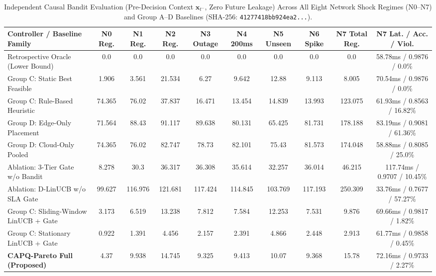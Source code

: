 \documentclass[10pt,journal,compsoc]{IEEEtran}
\begin{document}
\begin{table}[!htbp]\centering\scriptsize
\caption{Independent Causal Bandit Evaluation (Pre-Decision Context $\mathbf{x}_{t^-}$, Zero Future Leakage) Across All Eight Network Shock Regimes (N0--N7) and Group A--D Baselines (SHA-256: \texttt{41277418bb924ea2...}).}
\setlength{\tabcolsep}{3.5pt}\begin{tabular}{@{}lccccccccc@{}}\toprule
\textbf{Controller / Baseline Family} & \textbf{N0 Reg.} & \textbf{N1 Reg.} & \textbf{N2 Reg.} & \textbf{N3 Outage} & \textbf{N4 200ms} & \textbf{N5 Unseen} & \textbf{N6 Spike} & \textbf{N7 Total Reg.} & \textbf{N7 Lat. / Acc. / Viol.} \\\midrule
Retrospective Oracle (Lower Bound) & 0.0 & 0.0 & 0.0 & 0.0 & 0.0 & 0.0 & 0.0 & 0.0 & 58.78ms / 0.9876 / 0.0\% \\
Group C: Static Best Feasible & 1.906 & 3.561 & 21.534 & 6.27 & 9.642 & 12.88 & 9.113 & 8.005 & 70.54ms / 0.9876 / 0.0\% \\
Group C: Rule-Based Heuristic & 74.365 & 76.02 & 37.837 & 16.471 & 13.454 & 14.839 & 13.993 & 123.075 & 61.93ms / 0.8563 / 16.82\% \\
Group D: Edge-Only Placement & 71.564 & 88.43 & 91.117 & 89.638 & 80.131 & 65.425 & 81.731 & 178.188 & 83.19ms / 0.9081 / 61.36\% \\
Group D: Cloud-Only Pooled & 74.365 & 76.02 & 82.747 & 78.73 & 82.101 & 75.43 & 81.573 & 174.048 & 58.88ms / 0.8085 / 25.0\% \\
Ablation: 3-Tier Gate w/o Bandit & 8.278 & 30.3 & 36.317 & 36.308 & 35.614 & 32.257 & 36.014 & 46.215 & 117.74ms / 0.9707 / 10.45\% \\
Ablation: D-LinUCB w/o SLA Gate & 99.627 & 116.976 & 121.681 & 117.424 & 114.845 & 103.769 & 117.193 & 250.309 & 33.76ms / 0.7677 / 57.27\% \\
Group C: Sliding-Window LinUCB + Gate & 3.173 & 6.519 & 13.238 & 7.812 & 7.584 & 12.253 & 7.531 & 9.876 & 69.66ms / 0.9817 / 1.82\% \\
Group C: Stationary LinUCB + Gate & 0.922 & 1.391 & 4.456 & 2.157 & 2.391 & 4.866 & 2.448 & 2.913 & 61.77ms / 0.9858 / 0.45\% \\
\textbf{CAPQ-Pareto Full (Proposed)} & 4.37 & 9.938 & 14.745 & 9.325 & 9.413 & 10.07 & 9.368 & 15.78 & 72.16ms / 0.9733 / 2.27\% \\
\bottomrule\end{tabular}\end{table}
\end{document}
